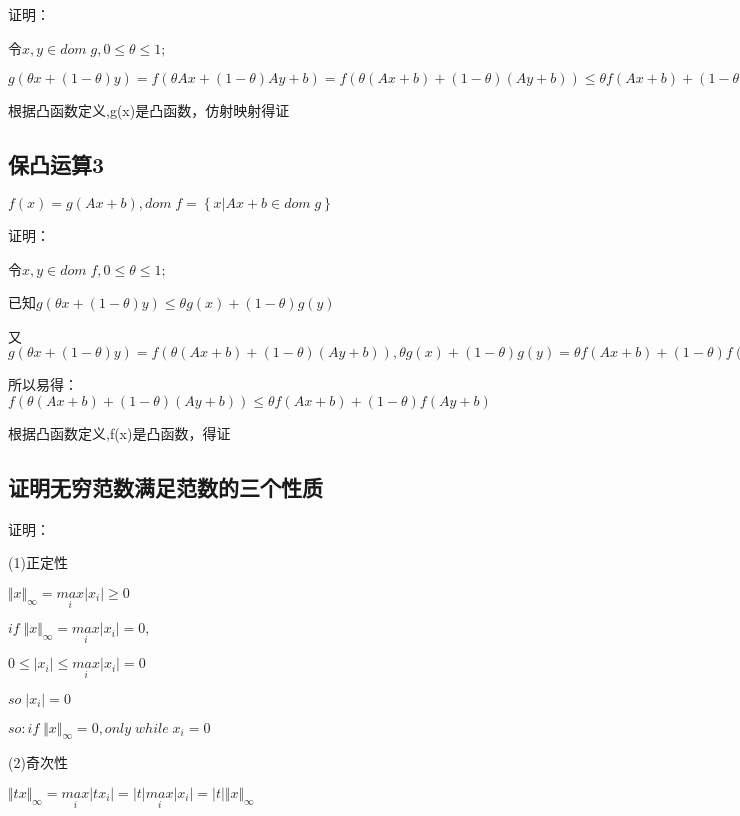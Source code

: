 \documentclass[12pt, a4paper, oneside, fontset=windows]{ctexart}
\begin{document}
证明：

令$x,y\in dom\; g,0\leq \theta \leq 1;$

$g(\theta x+\left (1- \theta \right )y) =f(\theta Ax+\left (1- \theta \right )Ay+b)=f(\theta \left ( Ax+b \right )+\left (1- \theta \right )\left ( Ay+b \right ))\leq \theta f(Ax+b)+\left (1- \theta \right )f(Ay+b)=\theta g(x)+\left (1- \theta \right ) g(y)$
  
根据凸函数定义,g(x)是凸函数，仿射映射得证
   
\subsection{保凸运算3}
$f(x)=g(Ax+b) ,dom\; f=\left \{  x|Ax+b\in  dom\; g  \right \}$

证明：

令$x,y\in dom\; f,0\leq \theta \leq 1;$

已知$g(\theta x+\left (1- \theta \right )y) \leq \theta g(x)+\left (1- \theta \right ) g(y)$

又$g(\theta x+\left (1- \theta \right )y)=f(\theta \left ( Ax+b \right )+\left (1- \theta \right )\left ( Ay+b \right )),
\theta g(x)+\left (1- \theta \right ) g(y)=\theta f(Ax+b)+\left (1- \theta \right )f(Ay+b)$

所以易得：$f(\theta \left ( Ax+b \right )+\left (1- \theta \right )\left ( Ay+b \right ))\leq \theta f(Ax+b)+\left (1- \theta \right )f(Ay+b)$

根据凸函数定义,f(x)是凸函数，得证
   
\subsection{证明无穷范数满足范数的三个性质}
证明：

(1)正定性

$\Vert x \Vert_\infty =\underset{i}{max}\left | x_{i} \right |\geq 0$

$if \;\Vert x \Vert_\infty = \underset{i}{max}\left | x_{i} \right |=0,$

$0\leq \left | x_{i} \right |\leq \underset{i}{max}\left | x_{i} \right |=0$

$so\;  \left | x_{i} \right |=0$

$so:if \;\Vert x \Vert_\infty = 0,only\; while \; x_{i}=0$

(2)奇次性

$\Vert tx \Vert_\infty=\underset{i}{max}\left | tx_{i} \right |=\left | t \right |\underset{i}{max}\left | x_{i} \right |
=\left | t \right |\Vert x \Vert_\infty$
\end{document}
